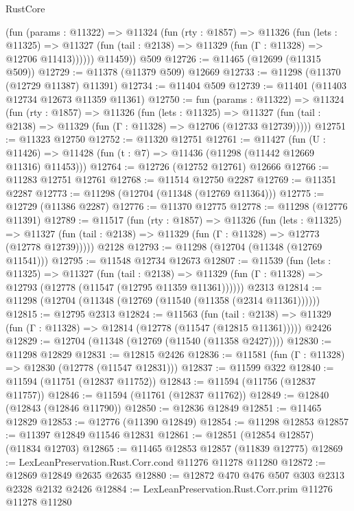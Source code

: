\begin{lexlean}{RustCore}
\begin{coremodule}
          (fun (params : @11322) =>
          @11324
            (fun (rty : @1857) =>
            @11326
              (fun (lets : @11325) =>
              @11327 (fun (tail : @2138) => @11329 (fun (Γ : @11328) => @12706 @11413))))))
        @11459))
    @509
@12726 := @11465 (@12699 (@11315 @509))
@12729 := @11378 (@11379 @509) @12669
@12733 := @11298 (@11370 (@12729 @11387) @11391)
@12734 := @11404 @509
@12739 := @11401 (@11403 @12734 @12673 @11359 @11361)
@12750 := fun (params : @11322) =>
  @11324
    (fun (rty : @1857) =>
    @11326
      (fun (lets : @11325) =>
      @11327 (fun (tail : @2138) => @11329 (fun (Γ : @11328) => @12706 (@12733 @12739)))))
@12751 := @11323 @12750
@12752 := @11320 @12751
@12761 := @11427
    (fun (U : @11426) => @11428 (fun (t : @7) => @11436 (@11298 (@11442 @12669 @11316) @11453)))
@12764 := @12726 (@12752 @12761) @12666
@12766 := @11283 @12751 @12761
@12768 := @11514 @12750 @2287
@12769 := @11351 @2287
@12773 := @11298 (@12704 (@11348 (@12769 @11364)))
@12775 := @12729 (@11386 @2287)
@12776 := @11370 @12775
@12778 := @11298 (@12776 @11391)
@12789 := @11517
    (fun (rty : @1857) =>
    @11326
      (fun (lets : @11325) =>
      @11327 (fun (tail : @2138) => @11329 (fun (Γ : @11328) => @12773 (@12778 @12739)))))
    @2128
@12793 := @11298 (@12704 (@11348 (@12769 @11541)))
@12795 := @11548 @12734 @12673
@12807 := @11539
    (fun (lets : @11325) =>
    @11327
      (fun (tail : @2138) =>
      @11329 (fun (Γ : @11328) => @12793 (@12778 (@11547 (@12795 @11359 @11361))))))
    @2313
@12814 := @11298 (@12704 (@11348 (@12769 (@11540 (@11358 (@2314 @11361))))))
@12815 := @12795 @2313
@12824 := @11563
    (fun (tail : @2138) => @11329 (fun (Γ : @11328) => @12814 (@12778 (@11547 (@12815 @11361)))))
    @2426
@12829 := @12704 (@11348 (@12769 (@11540 (@11358 @2427))))
@12830 := @11298 @12829
@12831 := @12815 @2426
@12836 := @11581 (fun (Γ : @11328) => @12830 (@12778 (@11547 @12831)))
@12837 := @11599 @322
@12840 := @11594 (@11751 (@12837 @11752))
@12843 := @11594 (@11756 (@12837 @11757))
@12846 := @11594 (@11761 (@12837 @11762))
@12849 := @12840 (@12843 (@12846 @11790))
@12850 := @12836 @12849
@12851 := @11465 @12829
@12853 := @12776 (@11390 @12849)
@12854 := @11298 @12853
@12857 := @11397 @12849 @11546 @12831
@12861 := @12851 (@12854 @12857) (@11834 @12703)
@12865 := @11465 @12853 @12857 (@11839 @12775)
@12869 := LexLeanPreservation.Rust.Corr.cond @11276 @11278 @11280
@12872 := @12869 @12849 @2635 @2635
@12880 := @12872 @470 @476 @507 @303 @2313 @2328 @2132 @2426
@12884 := LexLeanPreservation.Rust.Corr.prim @11276 @11278 @11280

\end{coremodule}
\end{lexlean}

